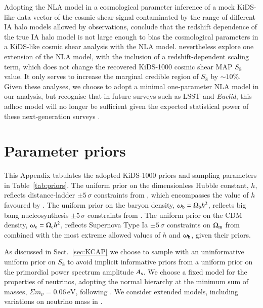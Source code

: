 \begin{appendix}
{Adopting the NLA model in a cosmological parameter inference of a mock KiDS-like data vector of the cosmic shear signal contaminated by the range of different IA halo models allowed by observations, \citet{fortuna/etal:2020} conclude that the redshift dependence of the true IA halo model is not large enough to bias the cosmological parameters in a KiDS-like cosmic shear analysis with the NLA model.   \citet{asgari/etal:2020} nevertheless explore one extension of the NLA model, with the inclusion of a redshift-dependent scaling term, which does not change the recovered KiDS-1000 cosmic shear MAP $S_8$ value.  It only serves to increase the marginal credible region of $S_8$ by $\sim 10\%$.   Given these analyses, we choose to adopt a minimal one-parameter NLA model in our \tttp analysis, but recognise that in future surveys such as LSST and {\it Euclid}, this adhoc model will no longer be sufficient given the expected statistical power of these next-generation surveys \citep{blazek/etal:2019, fortuna/etal:2020}.

}

\section{Parameter priors}
\label{app:priors}
This Appendix tabulates the adopted KiDS-1000 priors and sampling parameters in Table~\ref{tab:priors}.   
The uniform prior on the dimensionless Hubble constant, $h$, reflects distance-ladder $\pm 5\,\sigma$ constraints from \citet{riess/etal:2016}, which encompasses the value of $h$ favoured by \citet{planck/etal:2018}.  
The uniform prior on the baryon density, $\omega_{\rm b}= \Omega_{\rm b}h^2$, reflects big bang nucleosynthesis $\pm 5\, \sigma$ constraints from \citet{olive/etal:2014}.   
The uniform prior on the CDM density, $\omega_{\rm c} = \Omega_{\rm c}h^2$, reflects Supernova Type Ia $\pm 5\, \sigma$ constraints on $\Omega_{\rm m}$ from \citet{scolnic/etal:2018} combined with the most extreme allowed values of $h$ and $\omega_{\rm b}$, given their priors.   

As discussed in Sect.~\ref{sec:KCAP} we choose to sample with an uninformative uniform prior on $S_8$ to avoid implicit informative priors from a uniform prior on the primordial power spectrum amplitude $A_{\rm s}$.    
We choose a fixed model for the properties of neutrinos, adopting the normal hierarchy at the minimum sum of masses, $\Sigma m_\nu = 0.06\,\mathrm{eV}$, following \citet{planck/etal:2018}.  
We consider extended models, including variations on neutrino mass in \citet{troester/etal:inprep}.


\end{appendix}
